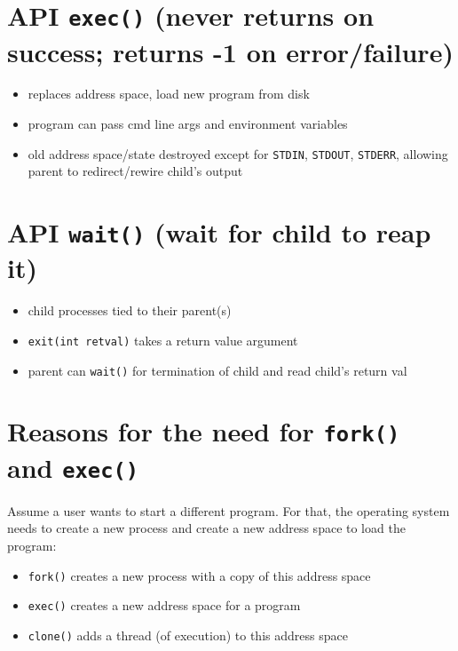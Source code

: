 \section*{API \texttt{exec()} (never returns on success; returns -1 on error/failure)}
\begin{itemize}
\item replaces address space, load new program from disk
\item program can pass cmd line args and environment variables
\item old address space/state destroyed except for \texttt{STDIN}, \texttt{STDOUT}, \texttt{STDERR}, allowing parent to redirect/rewire child's output
\end{itemize}
\section*{API \texttt{wait()} (wait for child to reap it) }
\begin{itemize}
\item child processes tied to their parent(s)
\item \texttt{exit(int retval)} takes a return value argument
\item parent can \texttt{wait()} for termination of child and read child's return val
\end{itemize}
\section*{Reasons for the need for \texttt{fork()} and \texttt{exec()}}
Assume a user wants to start a different program. For that, the operating system needs to create a new process and create a new address space to load the program:
\begin{itemize}
\item \texttt{fork()} creates a new process with a copy of this address space
\item \texttt{exec()} creates a new address space for a program
\item \texttt{clone()} adds a thread (of execution) to this address space
\end{itemize}
